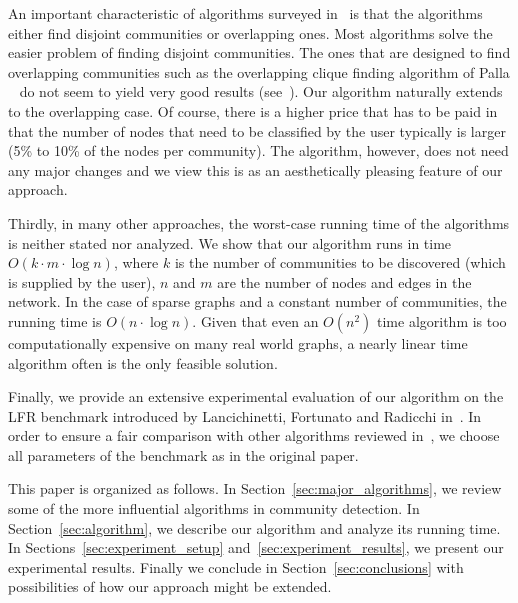 An important characteristic of algorithms surveyed in~\cite{LF09} 
is that the algorithms either find disjoint communities or overlapping 
ones. Most algorithms solve the easier problem of finding disjoint communities. 
The ones that are designed to find overlapping communities such as the overlapping clique finding 
algorithm of Palla \etal~\cite{PDFV05} do not seem to yield very good results (see~\cite{LF09}).
Our algorithm naturally extends to the overlapping case. Of course, there is a higher 
price that has to be paid in that the number of nodes that need to be classified by the user 
typically is larger (5\% to 10\% of the nodes per community). The algorithm, however,
does not need any major changes and we view this is as an aesthetically pleasing 
feature of our approach. 

Thirdly, in many other approaches, the worst-case running time of the algorithms 
is neither stated nor analyzed. We show that our algorithm runs in time $O(k \cdot m \cdot \log n)$, 
where $k$ is the number of communities to be discovered (which is supplied by the user), 
$n$ and $m$ are the number of nodes and edges in the network. In the case of sparse graphs 
and a constant number of communities, the running time is $O(n \cdot \log n)$. Given that even 
an $O(n^2)$ time algorithm is too computationally expensive on many real world graphs, 
a nearly linear time algorithm often is the only feasible solution.   

Finally, we provide an extensive experimental evaluation of our algorithm on the LFR benchmark
introduced by Lancichinetti, Fortunato and Radicchi in~\cite{LFR08, LF09}. In order to ensure 
a fair comparison with other algorithms reviewed in~\cite{LF09}, 
we choose all parameters of the benchmark as in the original paper.


This paper is organized as follows. In Section~\ref{sec:major_algorithms}, we review some 
of the more influential algorithms in community detection. In Section~\ref{sec:algorithm}, we 
describe our algorithm and analyze its running time. In Sections~\ref{sec:experiment_setup} 
and~\ref{sec:experiment_results}, we present our experimental results. Finally we conclude 
in Section~\ref{sec:conclusions} with possibilities of how our approach might be extended. 



